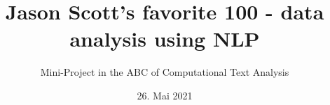 \title{Jason Scott's favorite 100 - data analysis using NLP}
\subtitle{Mini-Project in the ABC of Computational Text Analysis}
\date{\small{26. Mai 2021}}
\maketitle




\setcounter{tocdepth}{3}
\tableofcontents

\newpage
{}